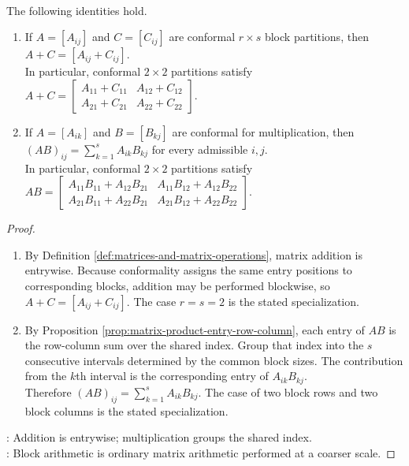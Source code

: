 \begin{proposition} \label{prop:block-matrix-arithmetic} \\
The following identities hold.
\begin{enumerate}[label=(\roman*)]
\setlength{\itemsep}{0pt}
\item If $A=[A_{ij}]$ and $C=[C_{ij}]$ are conformal $r\times s$ block partitions, then $A+C=[A_{ij}+C_{ij}]$.\\
In particular, conformal $2\times2$ partitions satisfy $A+C=\left[\begin{smallmatrix}A_{11}+C_{11}&A_{12}+C_{12}\\A_{21}+C_{21}&A_{22}+C_{22}\end{smallmatrix}\right]$.
\item If $A=[A_{ik}]$ and $B=[B_{kj}]$ are conformal for multiplication, then $(AB)_{ij}=\sum\limits_{k=1}^{s}A_{ik}B_{kj}$ for every admissible $i,j$.\\
In particular, conformal $2\times2$ partitions satisfy $AB=\left[\begin{smallmatrix}A_{11}B_{11}+A_{12}B_{21}&A_{11}B_{12}+A_{12}B_{22}\\A_{21}B_{11}+A_{22}B_{21}&A_{21}B_{12}+A_{22}B_{22}\end{smallmatrix}\right]$.
\end{enumerate}
\begin{proof}
\begin{enumerate}[label=(\roman*)]
\setlength{\itemsep}{0pt}
\item By Definition \ref{def:matrices-and-matrix-operations}, matrix addition is entrywise. Because conformality assigns the same entry positions to corresponding blocks, addition may be performed blockwise, so $A+C=[A_{ij}+C_{ij}]$. The case $r=s=2$ is the stated specialization.
\item By Proposition \ref{prop:matrix-product-entry-row-column}, each entry of $AB$ is the row-column sum over the shared index. Group that index into the $s$ consecutive intervals determined by the common block sizes. The contribution from the $k$th interval is the corresponding entry of $A_{ik}B_{kj}$.\\
Therefore $(AB)_{ij}=\sum\limits_{k=1}^{s}A_{ik}B_{kj}$. The case of two block rows and two block columns is the stated specialization.
\end{enumerate}
: Addition is entrywise; multiplication groups the shared index.\\
: Block arithmetic is ordinary matrix arithmetic performed at a coarser scale.
\end{proof}
\end{proposition}

